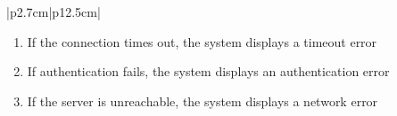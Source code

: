 \begin{table}[H]
\begin{tabular}{|p{2.7cm}|p{12.5cm}|}
\begin{minipage}[t]{\linewidth}
                                      \begin{enumerate}[topsep=0pt,itemsep=1pt,parsep=0pt,partopsep=0pt]
                                          \item If the connection times out, the system displays a timeout error
                                          \item If authentication fails, the system displays an authentication error
                                          \item If the server is unreachable, the system displays a network error
                                      \end{enumerate}
                                  \end{minipage}                      \\
        \hline
    \end{tabular}
    \label{tab:admin-test-server-connection}
\end{table}
